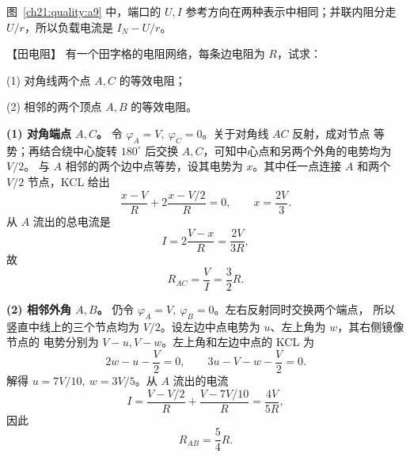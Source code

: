 {\begin{xesolution}
图~\ref{ch21:quality:a9} 中，端口的 $U,I$ 参考方向在两种表示中相同；并联内阻分走 $U/r$，所以负载电流是 $I_N-U/r$。
\end{xesolution}



\begin{origexamplebox}{【田电阻】}\label{ch21:ex:s37-6-2}
有一个田字格的电阻网络，每条边电阻为 $R$，试求：

(1) 对角线两个点 $A,C$ 的等效电阻；

(2) 相邻的两个顶点 $A,B$ 的等效电阻。
\par\noindent\begin{minipage}{\linewidth}
\gridProblemFigure
{}
\end{minipage}\par\medskip
\end{origexamplebox}\par\nopagebreak[4]


\begin{xesolution}
\textbf{(1) 对角端点 $A,C$。} 令 $\varphi_A=V,\ \varphi_C=0$。关于对角线 $AC$ 反射，成对节点
等势；再结合绕中心旋转 $180^\circ$ 后交换 $A,C$，可知中心点和另两个外角的电势均为 $V/2$。
与 $A$ 相邻的两个边中点等势，设其电势为 $x$。其中任一点连接 $A$ 和两个 $V/2$ 节点，KCL 给出
\[
  \frac{x-V}{R}+2\frac{x-V/2}{R}=0,
  \qquad x=\frac{2V}{3}.
\]
从 $A$ 流出的总电流是
\[
  I=2\frac{V-x}{R}=\frac{2V}{3R},
\]
故
\[
  \boxed{R_{AC}=\frac VI=\frac32R}.
\]

\par\noindent\begin{minipage}{\linewidth}
\gridPotentialDiagonalFigure
{}
\end{minipage}\par\medskip

\textbf{(2) 相邻外角 $A,B$。} 仍令 $\varphi_A=V,\ \varphi_B=0$。左右反射同时交换两个端点，
所以竖直中线上的三个节点均为 $V/2$。设左边中点电势为 $u$、左上角为 $w$，其右侧镜像节点的
电势分别为 $V-u,V-w$。左上角和左边中点的 KCL 为
\[
  2w-u-\frac V2=0,
  \qquad
  3u-V-w-\frac V2=0.
\]
解得 $u=7V/10,\ w=3V/5$。从 $A$ 流出的电流
\[
  I=\frac{V-V/2}{R}+\frac{V-7V/10}{R}=\frac{4V}{5R},
\]
因此
\[
  \boxed{R_{AB}=\frac54R}.
\]

\par\noindent\begin{minipage}{\linewidth}
\gridPotentialAdjacentFigure
{}
\end{minipage}\par\medskip


\end{xesolution}}
